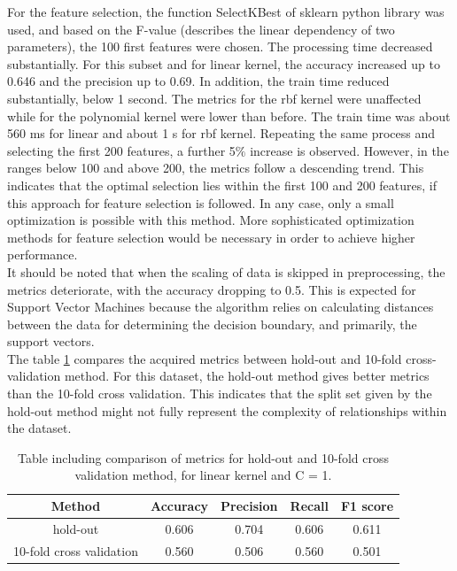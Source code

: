\documentclass{article}
\begin{document}
For the feature selection, the function SelectKBest of sklearn python library was used, and based on the F-value (describes the linear dependency of two parameters), the 100 first features were chosen. The processing time decreased substantially. For this subset and for linear kernel, the accuracy increased up to 0.646 and the precision up to 0.69. In addition, the train time reduced substantially, below 1 second. The metrics for the rbf kernel were unaffected while for the polynomial kernel were lower than before. The train time was about 560 ms for linear and about 1 s for rbf kernel. Repeating the same process and selecting the first 200 features, a further 5$\%$ increase is observed. However, in the ranges below 100 and above 200, the metrics follow a descending trend. This indicates that the optimal selection lies within the first 100 and 200 features, if this approach for feature selection is followed. In any case, only a small optimization is possible with this method. More sophisticated optimization methods for feature selection would be necessary in order to achieve higher performance.
\\
It should be noted that when the scaling of data is skipped in preprocessing, the metrics deteriorate, with the accuracy dropping to 0.5. This is expected for Support Vector Machines because the algorithm relies on calculating distances between the data for determining the decision boundary, and primarily, the support vectors. 
\\ 
The table \ref{table:reviews_SVM_cross} compares the acquired metrics between hold-out and 10-fold cross-validation method. For this dataset, the hold-out method gives better metrics than the 10-fold cross validation. This indicates that the split set given by the hold-out method might not fully represent the complexity of relationships within the dataset. 
\begin{table}[h!]
\centering
\begin{tabular}{||c c c c c||} 
 \hline
Method &  Accuracy & Precision & Recall & F1 score \\ [0.5ex] 
 \hline\hline
hold-out & 0.606 & 0.704 & 0.606 & 0.611  \\  
 10-fold cross validation &  0.560&  0.506 & 0.560& 0.501 \\ [1ex] 
 \hline
\end{tabular}
\caption{Table including comparison of metrics for hold-out and 10-fold cross validation method, for linear kernel and C = 1.}
\label{table:reviews_SVM_cross}
\end{table}
\end{document}
